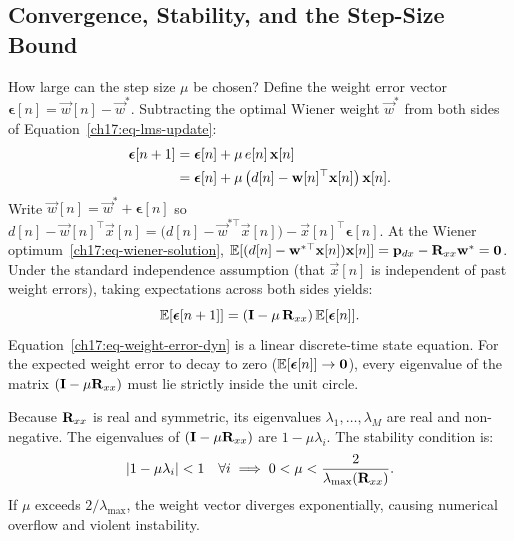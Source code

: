 \subsection{Convergence, Stability, and the Step-Size Bound}
\label{ch17:lms-convergence}

How large can the step size $\mu$ be chosen?
Define the weight error vector $\boldsymbol{\epsilon}[n] = \vec{w}[n] - \vec{w}^*$. Subtracting the optimal Wiener weight $\vec{w}^*$ from both sides of Equation~\eqref{ch17:eq-lms-update}:
\begin{align}
  \boldsymbol{\epsilon}[n+1] &= \boldsymbol{\epsilon}[n] + \mu\, e[n]\, \vec{x}[n] \notag \\
                             &= \boldsymbol{\epsilon}[n] + \mu \left( d[n] - \vec{w}[n]^\top \vec{x}[n] \right) \vec{x}[n] .
\end{align}
Write $\vec{w}[n] = \vec{w}^* + \boldsymbol{\epsilon}[n]$ so $d[n] - \vec{w}[n]^\top\vec{x}[n] = \bigl(d[n] - \vec{w}^{*\top}\vec{x}[n]\bigr) - \vec{x}[n]^\top\boldsymbol{\epsilon}[n]$. At the Wiener optimum~\eqref{ch17:eq-wiener-solution}, $\E[(d[n] - \vec{w}^{*\top}\vec{x}[n])\vec{x}[n]] = \vec{p}_{dx} - \mat{R}_{xx}\vec{w}^* = \vec{0}$. Under the standard independence assumption (that $\vec{x}[n]$ is independent of past weight errors), taking expectations across both sides yields:
\begin{equation}
  \E[\boldsymbol{\epsilon}[n+1]] = \left( \mat{I} - \mu\, \mat{R}_{xx} \right) \E[\boldsymbol{\epsilon}[n]] .
  \label{ch17:eq-weight-error-dyn}
\end{equation}
Equation~\eqref{ch17:eq-weight-error-dyn} is a linear discrete-time state equation. For the expected weight error to decay to zero ($\E[\boldsymbol{\epsilon}[n]] \to \vec{0}$), every eigenvalue of the matrix $(\mat{I} - \mu \mat{R}_{xx})$ must lie strictly inside the unit circle.

Because $\mat{R}_{xx}$ is real and symmetric, its eigenvalues $\lambda_1, \dots, \lambda_M$ are real and non-negative. The eigenvalues of $(\mat{I} - \mu \mat{R}_{xx})$ are $1 - \mu \lambda_i$. The stability condition is:
\begin{equation}
  \abs{1 - \mu \lambda_i} < 1 \quad \forall i \implies 0 < \mu < \frac{2}{\lambda_{\max}(\mat{R}_{xx})} .
  \label{ch17:eq-lms-bound}
\end{equation}
If $\mu$ exceeds $2/\lambda_{\max}$, the weight vector diverges exponentially, causing numerical overflow and violent instability.

